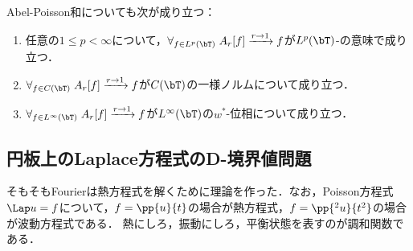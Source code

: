 \documentclass[uplatex,dvipdfmx]{jsreport}
\begin{document}
\begin{theorem}
    Abel-Poisson和についても次が成り立つ：
    \begin{enumerate}
        \item 任意の$1\le p<\infty$について，$\forall_{f\in L^p(\bT)}\;A_r[f]\xrightarrow{r\to1}f$が$L^p(\bT)$-の意味で成り立つ．
        \item $\forall_{f\in C(\bT)}\;A_r[f]\xrightarrow{r\to1}f$が$C(\bT)$の一様ノルムについて成り立つ．
        \item $\forall_{f\in L^\infty(\bT)}\;A_r[f]\xrightarrow{r\to 1}f$が$L^\infty(\bT)$の$w^*$-位相について成り立つ．
    \end{enumerate}
\end{theorem}

\subsection{円板上のLaplace方程式のD-境界値問題}

\begin{tcolorbox}[colframe=ForestGreen, colback=ForestGreen!10!white,breakable,colbacktitle=ForestGreen!40!white,coltitle=black,fonttitle=\bfseries\sffamily,
title=]
    そもそもFourierは熱方程式を解くために理論を作った．なお，Poisson方程式$\Lap u=f$について，$f=\pp{u}{t}$の場合が熱方程式，$f=\pp{^2u}{t^2}$の場合が波動方程式である．
    熱にしろ，振動にしろ，平衡状態を表すのが調和関数である．
\end{tcolorbox}
\end{document}
